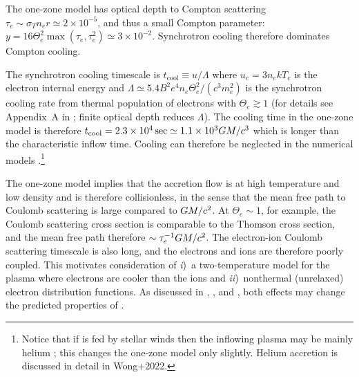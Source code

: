 The one-zone model has optical depth to Compton scattering $\tau_e \sim \sigma_T n_e r \simeq 2\times10^{-5}$, and thus a small Compton parameter: $y = 16 \Theta_e^2 \max(\tau_e,\tau_e^2) \simeq 3\times10^{-2}$.
Synchrotron cooling therefore dominates Compton cooling.

The synchrotron cooling timescale is $t_\mathrm{cool} \equiv u/\Lambda$ where $u_e = 3 n_e k T_e$ is the electron internal energy and $\Lambda \simeq 5.4 B^2 e^4 n_e \Theta_e^2 /(c^3 m_e^2)$ is the synchrotron cooling rate from thermal population of electrons with $\Theta_e \gtrsim 1$ (for details see Appendix~A in \citealt{2011ApJ...735....9M}; finite optical depth reduces $\Lambda$).
The cooling time in the one-zone model is therefore $t_\mathrm{cool}=2.3 \times 10^4\,\mathrm{sec} \simeq 1.1 \times 10^3 GM/c^3$ which is longer than the characteristic inflow time.
Cooling can therefore be neglected in the numerical models \citep[e.g.,][]{2012MNRAS.426.1928D}.\footnote{Notice that if \sgra is fed by stellar winds then the inflowing plasma may be mainly helium \citep{2019MNRAS.482L.123R}; this changes the one-zone model only slightly. Helium accretion is discussed in detail in Wong+2022.}

The one-zone model implies that the accretion flow is at high temperature and low density and is therefore collisionless, in the sense that the mean free path to Coulomb scattering is large compared to $GM/c^2$.
At $\Theta_e \sim 1$, for example, the Coulomb scattering cross section is comparable to the Thomson cross section, and the mean free path therefore $\sim \tau_e^{-1} GM/c^2$.
The electron-ion Coulomb scattering timescale is also long, and the electrons and ions are therefore poorly coupled.
This motivates consideration of
\emph{i})~a two-temperature model for the plasma where electrons are cooler than the ions \citep{1976ApJ...204..187S,1977ApJ...214..840I, 1982Natur.295...17R} and
\emph{ii})~nonthermal (unrelaxed) electron distribution functions.
As discussed in \citet{2000ApJ...541..234O}, \citet{2009ApJ...701..521C}, and \citet{2014A&A...570A...7M} \citep[see also more recent work by][]{2018A&A...612A..34D,2021arXiv211102518F, 2021NatAs.tmp..218C, 2021arXiv211203933E}, both effects may change the predicted properties of \sgra.

